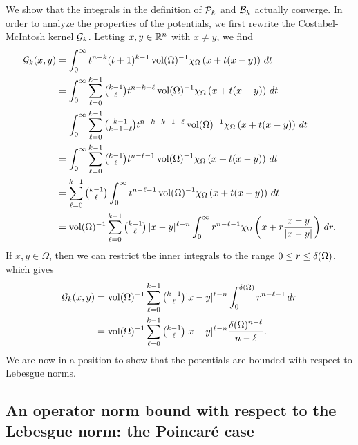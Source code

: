 \documentclass[10pt,a4paper]{article}
\begin{document}
We show that the integrals in the definition of ${\mathcal P}_{k}$ and ${\mathcal B}_{k}$ actually converge. 
In order to analyze the properties of the potentials,
we first rewrite the Costabel-McIntosh kernel ${\mathcal G}_{k}$.
Letting $x,y \in {\mathbb R}^n$ with $x \neq y$, we find 
\begin{align*}
    {\mathcal G}_{k}(x,y) 
    &= 
    \int_{0}^{\infty} t^{n-k} (t+1)^{k-1} \operatorname{vol}(\Omega)^{-1} \chi_{\Omega} \left( x+t(x-y) \right)\,dt
    \\
    &= 
    \int_{0}^{\infty} \sum_{\ell=0}^{k-1} \tbinom{k-1}{\ell} t^{n-k+\ell} \operatorname{vol}(\Omega)^{-1} \chi_{\Omega} \left( x+t(x-y) \right)\,dt
    \\
    &= 
    \int_{0}^{\infty} \sum_{\ell=0}^{k-1} \tbinom{k-1}{k-1-\ell} t^{n-k+k-1-\ell} \operatorname{vol}(\Omega)^{-1} \chi_{\Omega} \left( x+t(x-y) \right)\,dt
    \\
    &= 
    \int_{0}^{\infty} \sum_{\ell=0}^{k-1} \tbinom{k-1}{\ell} t^{n-\ell-1} \operatorname{vol}(\Omega)^{-1} \chi_{\Omega} \left( x+t(x-y) \right)\,dt
    \\
    &= 
    \sum_{\ell=0}^{k-1} \tbinom{k-1}{\ell} \int_{0}^{\infty} t^{n-\ell-1} \operatorname{vol}(\Omega)^{-1} \chi_{\Omega}\left( x+t(x-y) \right)\,dt 
    \\
    &= 
    \operatorname{vol}(\Omega)^{-1} \sum_{\ell=0}^{k-1} \tbinom{k-1}{\ell} \, |x-y|^{\ell-n} \int_{0}^{\infty} r^{n-\ell-1} \chi_{\Omega}\left(x+r\frac{x-y}{|x-y|}\right)\,dr
    .
\end{align*}
If $x, y \in \Omega$, then we can restrict the inner integrals to the range $0 \leq r \leq {\delta}(\Omega)$, which gives 
\begin{align*}
    {\mathcal G}_{k}(x,y) 
    &= 
    \operatorname{vol}(\Omega)^{-1} \sum_{\ell=0}^{k-1}\tbinom{k-1}{\ell} |x-y|^{\ell-n} \int_{0}^{{\delta}(\Omega)} r^{n-\ell-1} \,dr 
    \\
    &= 
    \operatorname{vol}(\Omega)^{-1} \sum_{\ell=0}^{k-1}\tbinom{k-1}{\ell} |x-y|^{\ell-n} \frac{ {\delta}(\Omega)^{n-\ell} }{n-\ell}.
\end{align*}
We are now in a position to show that the potentials are bounded with respect to Lebesgue norms. 

\subsection{An operator norm bound with respect to the Lebesgue norm: the Poincar\'e case}
\end{document}
